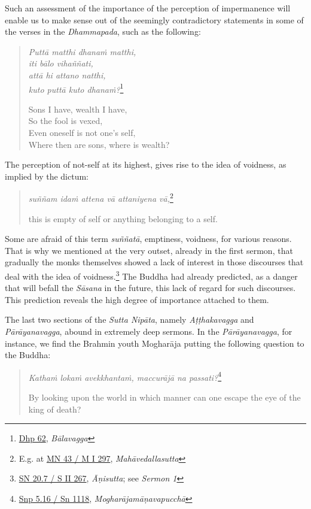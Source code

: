 Such an assessment of the importance of the perception of impermanence will enable us to make sense out of the seemingly contradictory statements in some of the verses in the \emph{Dhammapada}, such as the following:

\clearpage

\begin{quote}
\emph{Puttā matthi dhanaṁ matthi,}\\
\emph{iti bālo vihaññati,}\\
\emph{attā hi attano natthi,}\\
\emph{kuto puttā kuto dhanaṁ?}\footnote{\href{https://suttacentral.net/dhp60-75/pli/ms}{Dhp 62}, \emph{Bālavagga}}

Sons I have, wealth I have,\\
So the fool is vexed,\\
Even oneself is not one's self,\\
Where then are sons, where is wealth?
\end{quote}

The perception of not-self at its highest, gives rise to the idea of voidness, as implied by the dictum:

\begin{quote}
\emph{suññam idaṁ attena vā attaniyena vā,}\footnote{E.g. at \href{https://suttacentral.net/mn43/pli/ms}{MN 43 / M I 297}, \emph{Mahāvedallasutta}}

this is empty of self or anything belonging to a self.
\end{quote}

Some are afraid of this term \emph{suññatā}, emptiness, voidness, for various reasons. That is why we mentioned at the very outset, already in the first sermon, that gradually the monks themselves showed a lack of interest in those discourses that deal with the idea of voidness.\footnote{\href{https://suttacentral.net/sn20.7/pli/ms}{SN 20.7 / S II 267}, \emph{Āṇisutta}; see \emph{Sermon 1}} The Buddha had already predicted, as a danger that will befall the \emph{Sāsana} in the future, this lack of regard for such discourses. This prediction reveals the high degree of importance attached to them.

The last two sections of the \emph{Sutta Nipāta}, namely \emph{Aṭṭhakavagga} and \emph{Pārāyanavagga}, abound in extremely deep sermons. In the \emph{Pārāyanavagga}, for instance, we find the Brahmin youth Mogharāja putting the following question to the Buddha:

\begin{quote}
\emph{Kathaṁ lokaṁ avekkhantaṁ, maccurājā na passati?}\footnote{\href{https://suttacentral.net/snp5.16/pli/ms}{Snp 5.16 / Sn 1118}, \emph{Mogharājamāṇavapucchā}}

By looking upon the world in which manner can one escape the eye of the king of death?
\end{quote}

